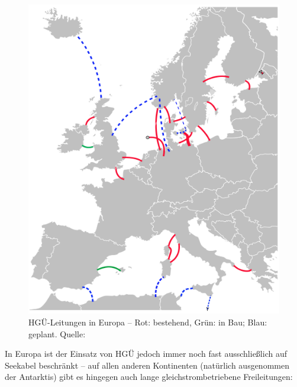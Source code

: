 \begin{figure}[hbtn]
\begin{center}
\noindent
\includegraphics[scale=0.55]{HVDC_Europe.png}
\end{center}
\caption{HGÜ-Leitungen in Europa -- Rot: bestehend, Grün: in Bau; Blau: geplant. Quelle: \cite{Europa}}
\label{pic:Europa}
\end{figure}

In Europa ist der Einsatz von HGÜ jedoch immer noch fast ausschließlich auf Seekabel beschränkt -- auf allen anderen Kontinenten (natürlich ausgenommen der Antarktis) gibt es hingegen auch lange gleichstrombetriebene Freileitungen:

